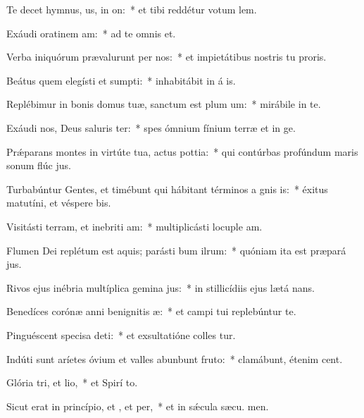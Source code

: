 \item Te decet hymnus, us, in on:~* et tibi reddétur votum  lem.
\item Exáudi oratinem am:~* ad te omnis  et.
\item Verba iniquórum prævalurunt per nos:~* et impietátibus nostris tu proris.
\item Beátus quem elegísti et sumpti:~* inhabitábit in á is.
\item Replébimur in bonis domus tuæ, sanctum est plum um:~* mirábile in te.
\item Exáudi nos, Deus saluris ter:~* spes ómnium fínium terræ et in  ge.
\item Prǽparans montes in virtúte tua, actus pottia:~* qui contúrbas profúndum maris sonum flúc jus.
\item Turbabúntur Gentes, et timébunt qui hábitant términos a gnis is:~* éxitus matutíni, et véspere bis.
\item Visitásti terram, et inebriti am:~* multiplicásti locuple am.
\item Flumen Dei replétum est aquis; parásti bum ilrum:~* quóniam ita est præpará jus.
\item Rivos ejus inébria multíplica gemina jus:~* in stillicídiis ejus lætá nans.
\item Benedíces corónæ anni benignitis æ:~* et campi tui replebúntur te.
\item Pinguéscent specisa deti:~* et exsultatióne colles tur.
\item Indúti sunt aríetes óvium et valles abunbunt fruto:~* clamábunt, étenim  cent.
\item Glória tri, et lio,~* et Spirí to.
\item Sicut erat in princípio, et , et per,~* et in sǽcula sæcu. men.
